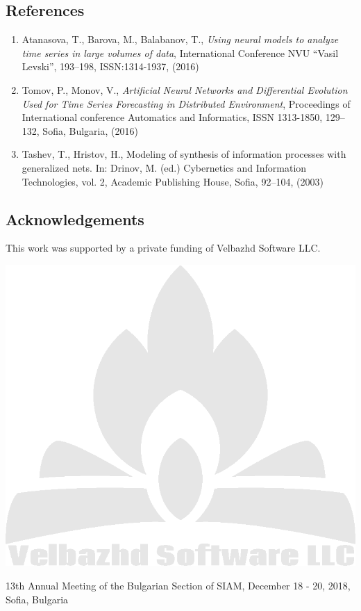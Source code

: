 \documentclass[a0,portrait,25pt]{sciposter}
\begin{document}
\begin{multicols}{3}
\begin{mdframed}[backgroundcolor=white,roundcorner=4pt,shadow=true,linewidth=1pt]
\section*{References}
\begin{enumerate}
\item Atanasova, T., Barova, M., Balabanov, T., \textit{Using neural models to analyze time series in large volumes of data}, International Conference  NVU “Vasil Levski”, 193--198, ISSN:1314-1937, (2016) 
\item Tomov, P., Monov, V., \textit{Artificial Neural Networks and Differential Evolution Used for Time Series Forecasting in Distributed Environment}, Proceedings of International conference Automatics and Informatics, ISSN 1313-1850, 129--132, Sofia, Bulgaria, (2016) 
\item Tashev, T., Hristov, H., Modeling of synthesis of information processes with generalized nets. In: Drinov, M. (ed.) Cybernetics and Information Technologies, vol. 2, Academic Publishing House, Sofia, 92–104, (2003) 
\end{enumerate}
\end{mdframed}

\begin{mdframed}[backgroundcolor=white,roundcorner=4pt,shadow=true,linewidth=1pt]
\section*{Acknowledgements}
This work was supported by a private funding of Velbazhd Software LLC. 

\includegraphics[width=0.98\linewidth]{veld_soft_camp_fire_logo}
\end{mdframed}
\end{multicols}

\begin{mdframed}[backgroundcolor=white,roundcorner=4pt,shadow=true,linewidth=1pt]
\color{Black}
13th Annual Meeting of the Bulgarian Section of SIAM, December 18 - 20, 2018, Sofia, Bulgaria
\end{mdframed}
\end{document}

